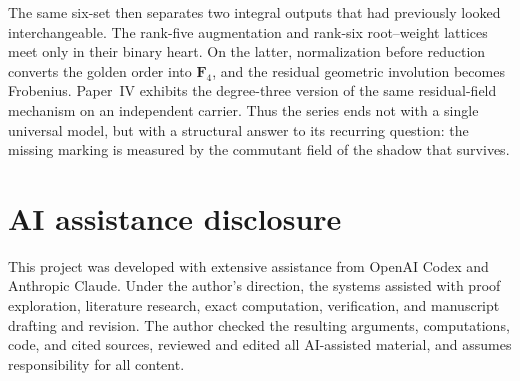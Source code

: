 \documentclass[11pt]{article}
\theoremstyle{definition}
\theoremstyle{remark}
\newcommand{\F}{\mathbf F}
\begin{document}
The same six-set then separates two integral outputs that had previously
looked interchangeable.  The rank-five augmentation and rank-six
root--weight lattices meet only in their binary heart.  On the latter,
normalization before reduction converts the golden order into \(\F_4\), and
the residual geometric involution becomes Frobenius.  Paper~IV exhibits the
degree-three version of the same residual-field mechanism on an independent
carrier.  Thus the series ends not with a single universal model, but with a
structural answer to its recurring question: the missing marking is measured
by the commutant field of the shadow that survives.

\section*{AI assistance disclosure}

This project was developed with extensive assistance from OpenAI Codex and
Anthropic Claude. Under the author's direction, the systems assisted with
proof exploration, literature research, exact computation, verification,
and manuscript drafting and revision. The author checked the resulting
arguments, computations, code, and cited sources, reviewed and edited all
AI-assisted material, and assumes responsibility for all content.
\end{document}
